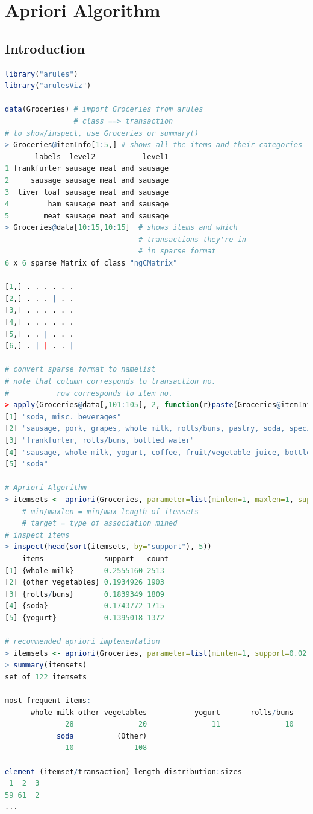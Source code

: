\documentclass{article}
\begin{document}
\section{Apriori Algorithm}
\subsection{Introduction}
\begin{lstlisting}[language=R]
library("arules")
library("arulesViz")

data(Groceries) # import Groceries from arules
                # class ==> transaction
# to show/inspect, use Groceries or summary()
> Groceries@itemInfo[1:5,] # shows all the items and their categories
       labels  level2           level1
1 frankfurter sausage meat and sausage
2     sausage sausage meat and sausage
3  liver loaf sausage meat and sausage
4         ham sausage meat and sausage
5        meat sausage meat and sausage
> Groceries@data[10:15,10:15]  # shows items and which 
                               # transactions they're in
                               # in sparse format
6 x 6 sparse Matrix of class "ngCMatrix"
                
[1,] . . . . . .
[2,] . . . | . .
[3,] . . . . . .
[4,] . . . . . .
[5,] . . | . . .
[6,] . | | . . |

# convert sparse format to namelist
# note that column corresponds to transaction no.
#           row corresponds to item no.
> apply(Groceries@data[,101:105], 2, function(r)paste(Groceries@itemInfo[r, "labels"], collapse=", "))
[1] "soda, misc. beverages"                                                                                                 
[2] "sausage, pork, grapes, whole milk, rolls/buns, pastry, soda, specialty bar, bathroom cleaner"                          
[3] "frankfurter, rolls/buns, bottled water"                                                                                
[4] "sausage, whole milk, yogurt, coffee, fruit/vegetable juice, bottled beer, softener, napkins, photo/film, shopping bags"
[5] "soda"   

# Apriori Algorithm
> itemsets <- apriori(Groceries, parameter=list(minlen=1, maxlen=1, support=0.02, target="frequent itemsets"))
    # min/maxlen = min/max length of itemsets
    # target = type of association mined
# inspect items    
> inspect(head(sort(itemsets, by="support"), 5))
    items              support   count
[1] {whole milk}       0.2555160 2513 
[2] {other vegetables} 0.1934926 1903 
[3] {rolls/buns}       0.1839349 1809 
[4] {soda}             0.1743772 1715 
[5] {yogurt}           0.1395018 1372 

# recommended apriori implementation
> itemsets <- apriori(Groceries, parameter=list(minlen=1, support=0.02, target ="frequent itemsets"))
> summary(itemsets)
set of 122 itemsets

most frequent items:
      whole milk other vegetables           yogurt       rolls/buns 
              28               20               11               10 
            soda          (Other) 
              10              108 

element (itemset/transaction) length distribution:sizes
 1  2  3 
59 61  2
...
\end{lstlisting}
\end{document}
